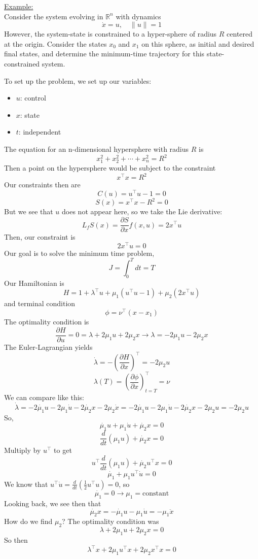 \documentclass{article}
\begin{document}
\noindent
\underline{Example:}\\[2mm]
Consider the system evolving in $\mathbb{R}^n$ with dynamics
\[\dot{x} = u, \quad \|u\| = 1\]
However, the system-state is constrained to a hyper-sphere of radius $R$
centered at the origin. Consider the states $x_0$ and $x_1$ on this sphere, as initial
and desired final states, and determine the minimum-time trajectory for this
state-constrained system.

\noindent
To set up the problem, we set up our variables:
\begin{itemize}
    \item $u$: control
    \item $x$: state
    \item $t$: independent
\end{itemize}
The equation for an n-dimensional hypersphere with radius $R$ is
\[x_1^2 + x_2^2 + \cdots + x_n^2 = R^2\]
Then a point on the hypersphere would be subject to the constraint
\[x^\top x = R^2\]
Our constraints then are
\[C(u) = u^\top u - 1 = 0\]
\[S(x) = x^\top x - R^2 = 0\]
But we see that $u$ does not appear here, so we take the Lie derivative:
\[L_f S(x) = \frac{\partial S}{\partial x}f(x,u) = 2x^\top u\]
Then, our constraint is
\[2x^\top u = 0\]
Our goal is to solve the minimum time problem,
\[J = \int_{0}^{T}dt = T\]
Our Hamiltonian is
\[H = 1 + \lambda^\top u + \mu_1(u^\top u - 1) + \mu_2(2x^\top u)\]
and terminal condition
\[\phi = \nu^\top(x-x_1)\]
The optimality condition is
\[\frac{\partial H}{\partial u} = 0 = \lambda + 2\mu_1 u + 2\mu_2 x
\rightarrow \lambda = -2\mu_1 u - 2\mu_2 x\]
The Euler-Lagrangian yields
\[\dot{\lambda} = -\left(\frac{\partial H}{\partial x}\right)^\top = -2\mu_2 u\]
\[\lambda(T) = \left(\frac{\partial\phi}{\partial x}\right)_{t=T}^\top = \nu\]
We can compare like this:
\[\dot{\lambda} = -2\dot{\mu_1}u - 2\mu_1\dot{u} - 2\dot{\mu_2}x - 2\mu_2\dot{x}
= -2\dot{\mu_1}u - 2\mu_1\dot{u} - 2\dot{\mu_2}x - 2\mu_2 u = -2\mu_2 u\]
So,
\[\dot{\mu_1}u + \mu_1\dot{u} + \dot{\mu_2}x = 0\]
\[\frac{d}{dt}(\mu_1 u) + \dot{\mu_2}x = 0\]
Multiply by $u^\top$ to get
\[u^\top\frac{d}{dt}(\mu_1 u) + \dot{\mu_2}u^\top x = 0\]
\[\dot{\mu_1} + \mu_1 u^\top\dot{u} = 0\]
We know that $u^\top\dot{u} = \frac{d}{dt}(\frac{1}{2}u^\top u) = 0$, so
\[\dot{\mu_1} = 0 \rightarrow \mu_1 = \text{constant}\]
Looking back, we see then that
\[\dot{\mu_2}x = -\dot{\mu_1}u - \mu_1\dot{u} = -\mu_1\ddot{x}\]
How do we find $\mu_2$? The optimality condition was
\[\lambda + 2\mu_1 u + 2\mu_2 x = 0\]
So then
\[\lambda^\top x + 2\mu_1 u^\top x + 2\mu_2 x^\top x = 0\]
\end{document}

